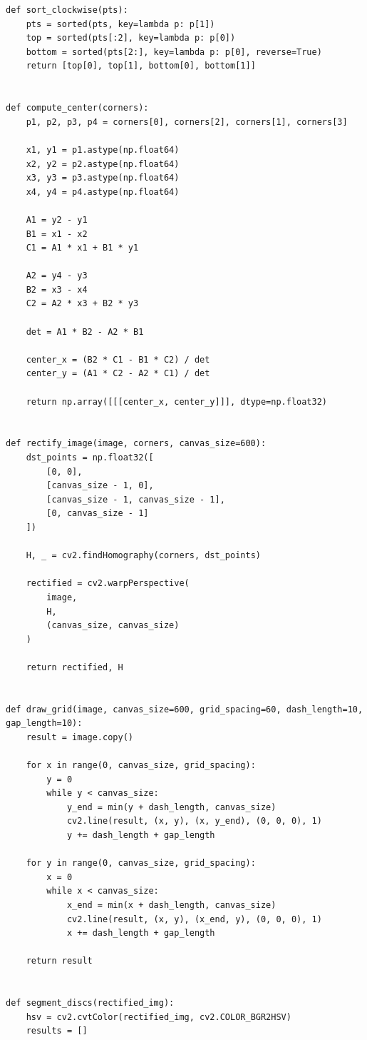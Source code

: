 \documentclass{article}
\begin{document}
\begin{latin}
\begin{LTR}
\begin{verbatim}
def sort_clockwise(pts):
    pts = sorted(pts, key=lambda p: p[1])
    top = sorted(pts[:2], key=lambda p: p[0])
    bottom = sorted(pts[2:], key=lambda p: p[0], reverse=True)
    return [top[0], top[1], bottom[0], bottom[1]]


def compute_center(corners):
    p1, p2, p3, p4 = corners[0], corners[2], corners[1], corners[3]
    
    x1, y1 = p1.astype(np.float64)
    x2, y2 = p2.astype(np.float64)
    x3, y3 = p3.astype(np.float64)
    x4, y4 = p4.astype(np.float64)
    
    A1 = y2 - y1
    B1 = x1 - x2
    C1 = A1 * x1 + B1 * y1
    
    A2 = y4 - y3
    B2 = x3 - x4
    C2 = A2 * x3 + B2 * y3
    
    det = A1 * B2 - A2 * B1
    
    center_x = (B2 * C1 - B1 * C2) / det
    center_y = (A1 * C2 - A2 * C1) / det
    
    return np.array([[[center_x, center_y]]], dtype=np.float32)


def rectify_image(image, corners, canvas_size=600):
    dst_points = np.float32([
        [0, 0],
        [canvas_size - 1, 0],
        [canvas_size - 1, canvas_size - 1],
        [0, canvas_size - 1]
    ])
    
    H, _ = cv2.findHomography(corners, dst_points)
    
    rectified = cv2.warpPerspective(
        image,
        H,
        (canvas_size, canvas_size)
    )
    
    return rectified, H


def draw_grid(image, canvas_size=600, grid_spacing=60, dash_length=10, gap_length=10):
    result = image.copy()
    
    for x in range(0, canvas_size, grid_spacing):
        y = 0
        while y < canvas_size:
            y_end = min(y + dash_length, canvas_size)
            cv2.line(result, (x, y), (x, y_end), (0, 0, 0), 1)
            y += dash_length + gap_length
    
    for y in range(0, canvas_size, grid_spacing):
        x = 0
        while x < canvas_size:
            x_end = min(x + dash_length, canvas_size)
            cv2.line(result, (x, y), (x_end, y), (0, 0, 0), 1)
            x += dash_length + gap_length
    
    return result


def segment_discs(rectified_img):
    hsv = cv2.cvtColor(rectified_img, cv2.COLOR_BGR2HSV)
    results = []
    

\end{verbatim}
\end{LTR}
\end{latin}
\end{document}
